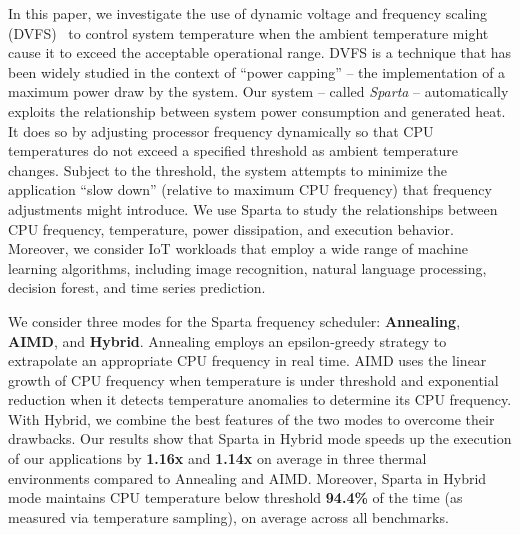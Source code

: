 In this paper, we investigate the use of dynamic voltage and frequency scaling (DVFS)~\cite{ref:Liu2007dvfs,ref:Wang2010dvfs} to control system temperature when the ambient temperature might cause it to exceed the acceptable operational range. DVFS is a technique that has been widely studied in the context of ``power capping'' -- the implementation of a maximum power draw by the system.  Our system -- called \textit{Sparta} --  automatically exploits the relationship between system power consumption and generated heat.  It does so by adjusting processor frequency dynamically so that CPU temperatures do not exceed a specified threshold as ambient temperature changes.  Subject to the threshold, the system attempts to minimize the application ``slow down'' (relative to maximum CPU frequency) that frequency adjustments might introduce.  
We use Sparta to study the relationships between CPU frequency, temperature, power dissipation, and execution behavior. Moreover, we consider IoT workloads that employ a wide range of machine learning algorithms, including image recognition, natural language processing, decision forest, and time series prediction. 


We consider three modes for the Sparta frequency scheduler: \textbf{Annealing}, \textbf{AIMD}, and \textbf{Hybrid}.  Annealing employs an epsilon-greedy strategy to extrapolate an appropriate CPU frequency in real time. AIMD uses the linear growth of CPU frequency when temperature is under threshold and exponential reduction when it detects temperature anomalies to determine its CPU frequency.  With Hybrid, we combine the best features of the two modes to overcome their drawbacks. Our results show that Sparta in Hybrid mode speeds up the execution of our applications by \textbf{1.16x} and \textbf{1.14x} on average in three thermal environments compared to Annealing and AIMD. Moreover, Sparta in Hybrid mode maintains CPU temperature below threshold \textbf{94.4\%} of the time (as measured via temperature sampling), on average across all benchmarks. 

